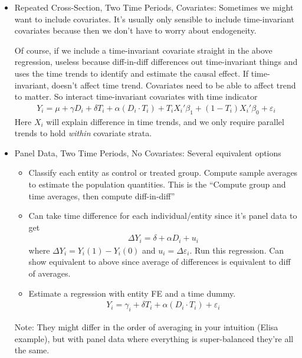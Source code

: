 \documentclass[12pt]{article}
\theoremstyle{plain}
\theoremstyle{definition}
\theoremstyle{remark}
\begin{document}
\begin{itemize}
\begin{itemize}
      \item Repeated Cross-Section, Two Time Periods, Covariates:
        Sometimes we might want to include covariates.
        It's usually only sensible to include time-invariant covariates
        because then we don't have to worry about endogeneity.

        Of course, if we include a time-invariant covariate straight in
        the above regression, useless because diff-in-diff differences
        out time-invariant things and uses the time trends to identify
        and estimate the causal effect. If time-invariant, doesn't
        affect time trend.
        Covariates need to be able to affect trend to matter.
        So interact time-invariant covariates with time indicator
        \begin{align*}
          Y_i =
          \mu + \gamma D_i + \delta T_i + \alpha (D_i\cdot T_i)
          + T_iX_i'\beta_1
          + (1-T_i)X_i'\beta_0
          + \varepsilon_i
        \end{align*}
        Here $X_i$ will explain difference in time trends, and we only
        require parallel trends to hold \emph{within} covariate strata.


      \item Panel Data, Two Time Periods, No Covariates:
        Several equivalent options
        \begin{itemize}
          \item
            Classify each entity as control or treated group.
            Compute sample averages to estimate the population
            quantities.
            This is the ``Compute group and time averages, then compute
            diff-in-diff''

          \item Can take time difference for each individual/entity
            since it's panel data to get
            \begin{align*}
              \Delta Y_i = \delta + \alpha D_i + u_i
            \end{align*}
            where $\Delta Y_i=Y_i(1)-Y_i(0)$ and $u_i=\Delta
            \varepsilon_i$. Run this regression.
            Can show equivalent to above since average of differences is
            equivalent to diff of averages.

          \item Estimate a regression with entity FE and a time dummy.
            \begin{align*}
              Y_i =
              \gamma_i + \delta T_i + \alpha (D_i\cdot T_i)
              + \varepsilon_i
            \end{align*}
        \end{itemize}
        Note: They might differ in the order of averaging in your
        intuition (Elisa example), but with panel data where everything
        is super-balanced they're all the same.


\end{itemize}
\end{itemize}
\end{document}
